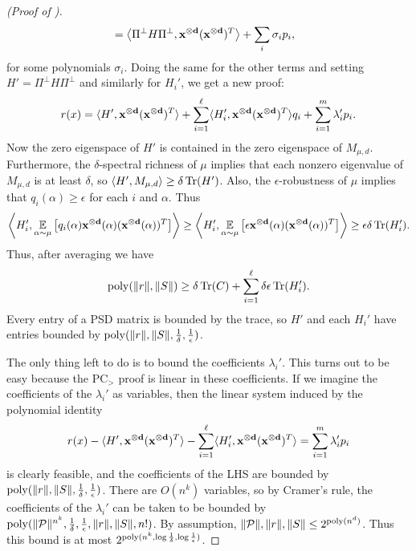\begin{proof}[(Proof of )]
\begin{align*}
&= \left\langle\Pi^\perp H \Pi^\perp, \mathbf{x^{\otimes d}}(\mathbf{x^{\otimes d}})^T\right\rangle + \sum_i \sigma_i p_i,
\end{align*}
for some polynomials $\sigma_i$. Doing the same for the other terms and setting $H' = \Pi^\perp H \Pi^\perp$ and similarly for $H_i'$, we get a new proof:
\[r(x) = \langle H', \mathbf{x^{\otimes d}}(\mathbf{x^{\otimes d}})^T\rangle + \sum_{i=1}^\ell \langle H_i', \mathbf{x^{\otimes d}}(\mathbf{x^{\otimes d}})^T\rangle q_i + \sum_{i=1}^m \lambda_i' p_i.\]
Now the zero eigenspace of $H'$ is contained in the zero eigenspace of $M_{\mu,d}$. Furthermore, the $\delta$-spectral richness of $\mu$ implies that each nonzero eigenvalue of $M_{\mu,d}$ is at least $\delta$, so $\left\langle H',M_{\mu,d}\right\rangle \geq \delta \operatorname{Tr}(H')$. Also, the $\epsilon$-robustness of $\mu$ implies that $q_i(\alpha) \geq \epsilon$ for each $i$ and $\alpha$. Thus 
\[\left\langle H'_i, \operatorname*{\mathbb{E}}_{\alpha \sim \mu}\left[q_i(\alpha)\mathbf{x^{\otimes d}}(\alpha)(\mathbf{x^{\otimes d}}(\alpha))^T\right]\right\rangle \geq \left\langle H'_i, \operatorname*{\mathbb{E}}_{\alpha \sim \mu}\left[\epsilon\mathbf{x^{\otimes d}}(\alpha)(\mathbf{x^{\otimes d}}(\alpha))^T\right]\right\rangle \geq \epsilon \delta \operatorname{Tr}(H'_i).\]
Thus, after averaging we have 
\[\operatorname{poly}(\|r\|,\|S\|) \geq \delta \operatorname{Tr}(C) + \sum_{i=1}^\ell \delta \epsilon\operatorname{Tr}(H'_i).\]
Every entry of a PSD matrix is bounded by the trace, so $H'$ and each $H_i'$ have entries bounded by $\operatorname{poly}(\|r\|, \|S\|, \frac{1}{\delta}, \frac{1}{\epsilon})$.

The only thing left to do is to bound the coefficients $\lambda_i'$. This turns out to be easy because the PC$_>$ proof is linear in these coefficients. If we imagine the coefficients of the $\lambda_i'$ as variables, then the linear system induced by the polynomial identity
\[r(x) - \langle H', \mathbf{x^{\otimes d}}(\mathbf{x^{\otimes d}})^T\rangle - \sum_{i=1}^\ell \langle H_i', \mathbf{x^{\otimes d}}(\mathbf{x^{\otimes d}})^T\rangle = \sum_{i=1}^m \lambda_i' p_i\]
is clearly feasible, and the coefficients of the LHS are bounded by $\operatorname{poly}(\|r\|, \|S\|, \frac{1}{\delta}, \frac{1}{\epsilon})$. There are $O(n^k)$ variables, so by Cramer's rule, the coefficients of the $\lambda_i'$ can be taken to be bounded by $\operatorname{poly}(\|\mathcal P\|^{n^k}, \frac{1}{\delta}, \frac{1}{\epsilon}, \|r\|, \|S\|, n!)$. By assumption, $\|\mathcal P\|, \|r\|, \|S\| \leq 2^{\operatorname{poly}(n^d)}$. Thus this bound is at most $2^{\operatorname{poly}(n^k, \log \frac{1}{\delta}, \log \frac{1}{\epsilon})}$. 
\end{proof}

